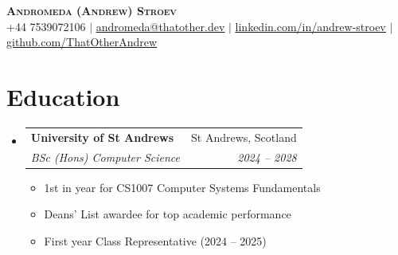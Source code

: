 \documentclass[letterpaper,11pt]{article}
\makeatletter
\newcommand{\resumeItem}[1]{
  \item\small{
    {#1 \vspace{-2pt}}
  }
}
\newcommand{\resumeSubheading}[4]{
  \vspace{-2pt}\item
    \begin{tabular*}{0.97\textwidth}[t]{l@{\extracolsep{\fill}}r}
      \textbf{#1} & #2 \\
      \textit{\small#3} & \textit{\small #4} \\
    \end{tabular*}\vspace{-7pt}
}
\newcommand{\resumeSubHeadingListStart}{\begin{itemize}[leftmargin=0.15in, label={}]}
\newcommand{\resumeSubHeadingListEnd}{\end{itemize}}
\newcommand{\resumeItemListStart}{\begin{itemize}}
\newcommand{\resumeItemListEnd}{\end{itemize}\vspace{-5pt}}
\makeatother
\begin{document}
\begin{center}
    \textbf{\Huge \scshape Andromeda (Andrew) Stroev} \\ \vspace{1pt}
    \small +44 7539072106 $|$ \href{mailto:andromeda@thatother.dev}{\underline{andromeda@thatother.dev}} $|$ 
    \href{https://linkedin.com/in/andrew-stroev}{\underline{linkedin.com/in/andrew-stroev}} $|$
    \href{https://github.com/ThatOtherAndrew}{\underline{github.com/ThatOtherAndrew}}
\end{center}

\section{Education}
  \resumeSubHeadingListStart
    \resumeSubheading
      {University of St Andrews}{St Andrews, Scotland}
      {BSc (Hons) Computer Science}{2024 -- 2028}
      \resumeItemListStart
        \resumeItem{1st in year for CS1007 Computer Systems Fundamentals}
        \resumeItem{Deans' List awardee for top academic performance}
        \resumeItem{First year Class Representative (2024 -- 2025)}
      \resumeItemListEnd
  \resumeSubHeadingListEnd
\end{document}
